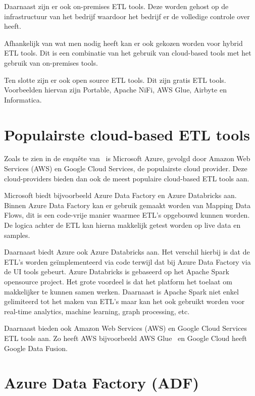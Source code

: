 Daarnaast zijn er ook on-premises ETL tools. Deze worden gehost op de infrastructuur van het bedrijf waardoor het bedrijf er de volledige controle over heeft.~\autocite{Ethan2024}

Afhankelijk van wat men nodig heeft kan er ook gekozen worden voor hybrid ETL tools. Dit is een combinatie van het gebruik van cloud-based tools met het gebruik van on-premises tools.~\autocite{Ethan2024}

Ten slotte zijn er ook open source ETL tools. Dit zijn gratis ETL tools. Voorbeelden hiervan zijn Portable, Apache NiFi, AWS Glue, Airbyte en Informatica.~\autocite{Ethan2024}

\section{Populairste cloud-based ETL tools}

Zoals te zien in de enquête van~\textcite{vines2023overview} is Microsoft Azure, gevolgd door Amazon Web Services (AWS) en Google Cloud Services, de populairste cloud provider. Deze cloud-providers bieden dan ook de meest populaire cloud-based ETL tools aan. 

Microsoft biedt bijvoorbeeld Azure Data Factory en Azure Databricks aan. Binnen Azure Data Factory kan er gebruik gemaakt worden van Mapping Data Flows, dit is een code-vrije manier waarmee ETL's opgebouwd kunnen worden. De logica achter de ETL kan hierna makkelijk getest worden op live data en samples.~\autocite{Kromer2022}

Daarnaast biedt Azure ook Azure Databricks aan. Het verschil hierbij is dat de ETL’s worden geïmplementeerd via code terwijl dat bij Azure Data Factory via de UI tools gebeurt. Azure Databricks is gebaseerd op het Apache Spark opensource project. Het grote voordeel is dat het platform het toelaat om makkelijker te kunnen samen werken. Daarnaast is Apache Spark niet enkel gelimiteerd tot het maken van ETL’s maar kan het ook gebruikt worden voor real-time analytics, machine learning, graph processing, etc.~\autocite{Etaati2019}

Daarnaast bieden ook Amazon Web Services (AWS) en Google Cloud Services ETL tools aan. Zo heeft AWS bijvoorbeeld AWS Glue~\autocite{Khan2024} en Google Cloud heeft Google Data Fusion.~\autocite{Jaiswal2022}

\section{Azure Data Factory (ADF)}

